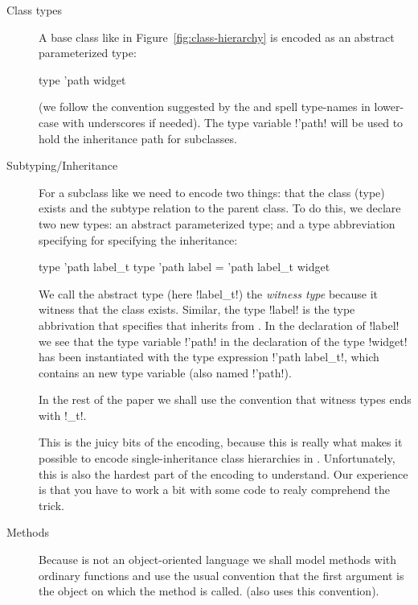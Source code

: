 \documentclass[workingdraft]{usetex-v1}
\begin{document}
\begin{description}
\item[Class types] A base class like  in
  Figure~\ref{fig:class-hierarchy} is encoded as an abstract
  parameterized type:
\begin{SMLcode}
type 'path widget
\end{SMLcode}
(we follow the convention suggested by the \smlbasis and spell
type-names in lower-case with underscores if needed).  The type
variable !'path! will be used to hold the inheritance path for
subclasses.


\item[Subtyping/Inheritance] For a subclass like  we
  need to encode two things: that the class (type) exists and the
  subtype relation to the parent class.  To do this, we declare two
  new \sml types: an abstract parameterized type; and a type
  abbreviation specifying for specifying the inheritance:
\begin{SMLcode}
type 'path label_t
type 'path label = 
        'path label_t widget
\end{SMLcode}
We call the abstract type (here !label_t!) the \emph{witness type}
because it witness that the class exists.  Similar, the type !label!
is the type abbrivation that specifies that  inherits
from .  In the declaration of !label!  we see that
the type variable !'path! in the declaration of the type !widget!  has
been instantiated with the type expression !'path label_t!, which
contains an new type variable (also named !'path!).

In the rest of the paper we shall use the convention that witness
types ends with !_t!.

This is the juicy bits of the encoding, because this is really what
makes it possible to encode single-inheritance class hierarchies in
\sml.  Unfortunately, this is also the hardest part of the encoding to
understand.  Our experience is that you have to work a bit with some
code to realy comprehend the trick.



\item[Methods] Because \sml is not an object-oriented language we shall
  model methods with ordinary functions and use the usual convention
  that the first argument is the object on which the method is called.
  (\gtk also uses this convention).
  

\end{description}
\end{document}

